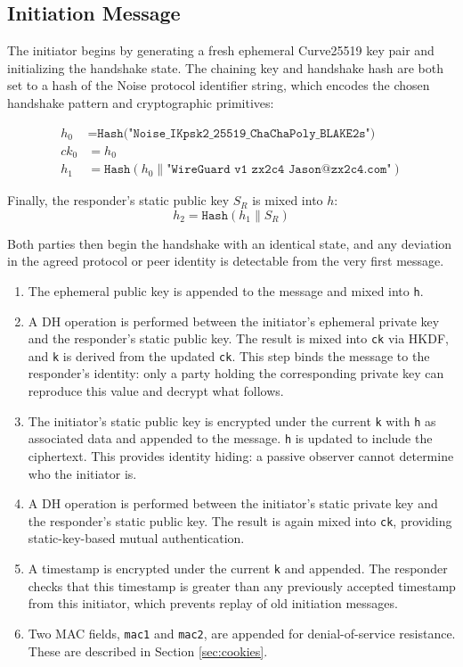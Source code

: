 \subsection{Initiation Message}
The initiator begins by generating a fresh ephemeral Curve25519 key pair and initializing the handshake state. The chaining key and handshake hash are both set to a hash of the Noise protocol identifier string, which encodes the chosen handshake pattern and cryptographic primitives: 

\begin{align*} h_0 &= \texttt{Hash("Noise\_IKpsk2\_25519\_ChaChaPoly\_BLAKE2s")} \\ ck_0 &= h_0 \\ h_1 &= \texttt{Hash}(h_0 \| \texttt{"WireGuard v1 zx2c4 Jason@zx2c4.com"}) \end{align*} 

Finally, the responder's static public key $S_R$ is mixed into $h$: 
\[ 
h_2 = \texttt{Hash}(h_1 \| S_R) 
\] 

Both parties then begin the handshake with an identical state, and any deviation in the agreed protocol or peer identity is detectable from the very first message.

\begin{enumerate}
    \item The ephemeral public key is appended to the message and mixed into 
    \texttt{h}.
    \item A DH operation is performed between the initiator's ephemeral private key and the responder's static public key. The result is mixed into \texttt{ck} via HKDF, and \texttt{k} is derived from the updated \texttt{ck}. This step binds the message to the responder's identity: only a party holding the corresponding private key can reproduce this value and decrypt what follows.
    \item The initiator's static public key is encrypted under the current \texttt{k} with \texttt{h} as associated data and appended to the message. \texttt{h} is updated to include the ciphertext. This provides identity hiding: a passive observer cannot determine who the initiator is.
    \item A DH operation is performed between the initiator's static private key and the responder's static public key. The result is again mixed into \texttt{ck}, providing static-key-based mutual authentication.
    \item A timestamp is encrypted under the current \texttt{k} and appended. The responder checks that this timestamp is greater than any previously accepted timestamp from this initiator, which prevents replay of old initiation messages.
    \item Two MAC fields, \texttt{mac1} and \texttt{mac2}, are appended for denial-of-service resistance. These are described in Section \ref{sec:cookies}.
\end{enumerate}

